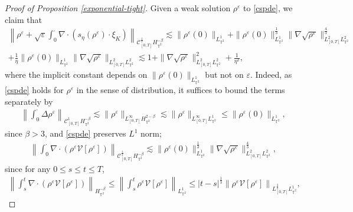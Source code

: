 \begin{proof}[Proof of Proposition \ref{exponential-tight}]
Given a weak solution $\rho^{\varepsilon}$ to \eqref{cspde}, we claim that 
\begin{align}\label{timereg-AC}
\left\|\rho^{\varepsilon} + \sqrt{\varepsilon}\int_0^{\cdot}\nabla\cdot\left(s_{\eta}(\rho^{\varepsilon})\cdot\xi_{K}\right)\right\|_{\mathcal{C}_{[0,T]}^{\frac{1}{3}} H^{-\beta}_{\mathbb{T}^2}} \lesssim \| \rho^{\varepsilon}(0)\|_{L_{\mathbb{T}^2}^1}\nonumber 
+  \|\rho^{\varepsilon}(0)\|_{L^1_{\mathbb{T}^2}}^{\frac{1}{3}} \|\nabla\sqrt{\rho^{\varepsilon}}\|_{L_{[0,T]}^2L^2_{\mathbb{T}^2}}^{\frac{4}{3}} \\ 
+  \frac{1}{\eta}\|\rho^{\varepsilon}(0)\|_{L^1_{\mathbb{T}^2}}\|\nabla\sqrt{\rho^{\varepsilon}}\|_{L_{[0,T]}^2L^2_{\mathbb{T}^2}} \lesssim 1 + \|\nabla\sqrt{\rho^{\varepsilon}}\|_{L_{[0,T]}^2L^2_{\mathbb{T}^2}}^{2} + \frac{1}{\eta^2},
\end{align}
where the implicit constant depends on $\|\rho^{\varepsilon}(0)\|_{L^1_{\mathbb{T}^2}}$ but not on $\varepsilon$.   Indeed, as \eqref{cspde} holds for $\rho^{\varepsilon}$ in the sense of distribution, it suffices to bound the terms separately by 
\begin{align}\label{timereg-AC1}
\left\|\int_0^{\cdot} \Delta \rho^{\varepsilon}\right\|_{\mathcal{C}_{[0,T]}^{1} H_{\mathbb{T}^2}^{-\beta}} \lesssim \| \rho^{\varepsilon}\|_{L_{[0,T]}^{\infty} H_{\mathbb{T}^2}^{2-\beta}} \lesssim \| \rho^{\varepsilon}\|_{L_{[0,T]}^{\infty} L_{\mathbb{T}^2}^1} \leq \| \rho^{\varepsilon}(0)\|_{L_{\mathbb{T}^2}^1},
\end{align}
since $\beta >3$, and \eqref{cspde} preserves $L^1$ norm;
\begin{align}\label{timereg-AC2}
\left\|\int_{0}^{\cdot} \nabla \cdot \left(\rho^{\varepsilon} \mathcal{V}[\rho^{\varepsilon}]\right)\right\|_{\mathcal{C}_{[0,T]}^{\frac{1}{3}} H_{\mathbb{T}^2}^{-\beta}} \lesssim  \|\rho^{\varepsilon}(0)\|_{L^1_{\mathbb{T}^2}}^{\frac{1}{3}}\|\nabla\sqrt{\rho^{\varepsilon}}\|_{L_{[0,T]}^2L^2_{\mathbb{T}^2}}^{\frac{4}{3}},
\end{align}
since for any $0\leq s\leq t \leq T$, 
\begin{align*}
\left\|\int_{s}^{t} \nabla \cdot \left(\rho^{\varepsilon} \mathcal{V}[\rho^{\varepsilon}]\right)\right\|_{H_{\mathbb{T}^2}^{-\beta}} \leq \left\|\int_{s}^{t} \rho^{\varepsilon} \mathcal{V}[\rho^{\varepsilon}]\right\|_{L_{\mathbb{T}^2}^1} \leq |t-s|^{\frac{1}{3}} \left\|\rho^{\varepsilon} \mathcal{V}[\rho^{\varepsilon}]\right\|_{L^{\frac{3}{2}}_{[0,T]}L_{\mathbb{T}^2}^1},

\end{align*}
\end{proof}
